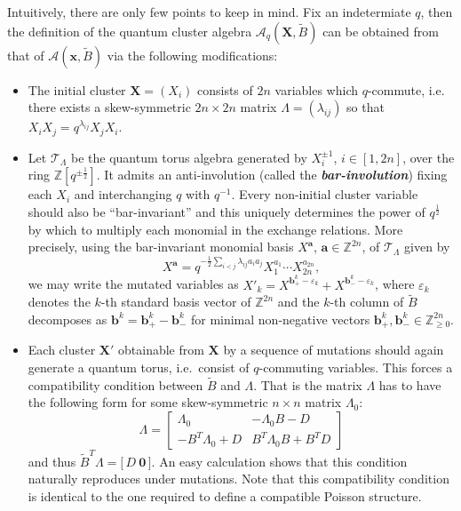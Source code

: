 \documentclass[12pt]{amsart}
\newcommand{\bfa}{\mathbf{a}}
\newcommand{\bfb}{\mathbf{b}}
\newcommand{\bfx}{\mathbf{x}}
\newcommand{\bfX}{\mathbf{X}}
\newcommand{\cA}{\mathcal{A}}
\newcommand{\cT}{\mathcal{T}}
\newcommand{\half}{{\frac{1}{2}}}
\newcommand{\ZZ}{\mathbb{Z}}
\newcommand{\newword}[1]{\textbf{\emph{#1}}}
\begin{document}
  Intuitively, there are only few points to keep in mind.
  Fix an indetermiate $q$, then the definition of the quantum cluster algebra $\cA_q(\bfX,\widetilde B)$ can be obtained from that of $\cA(\bfx,\widetilde B)$ via the following modifications:
  \begin{itemize}
    \item 
      The initial cluster $\bfX=(X_i)$ consists of $2n$ variables which $q$-commute, i.e. there exists a skew-symmetric $2n\times 2n$ matrix $\Lambda=(\lambda_{ij})$ so that $X_iX_j=q^{\lambda_{ij}}X_jX_i$.  
    
    \item 
      Let $\cT_\Lambda$ be the quantum torus algebra generated by $X_i^{\pm1}$, $i\in[1,2n]$, over the ring $\ZZ[q^{\pm\half}]$.
      It admits an anti-involution (called the \newword{bar-involution}) fixing each $X_i$ and interchanging $q$ with $q^{-1}$.
      Every non-initial cluster variable should also be ``bar-invariant'' and this uniquely determines the power of $q^\half$ by which to multiply each monomial in the exchange relations.  
      More precisely, using the bar-invariant monomial basis $X^\bfa$, $\bfa\in\ZZ^{2n}$, of $\cT_\Lambda$ given by
      \[
        X^\bfa=q^{-\half\sum\limits_{i<j}\lambda_{ij}a_ia_j}X_1^{a_1}\cdots X_{2n}^{a_{2n}},
      \]
      we may write the mutated variables as $X'_k=X^{\bfb_+^k-\varepsilon_k}+X^{\bfb_-^k-\varepsilon_k}$, where $\varepsilon_k$ denotes the $k$-th standard basis vector of $\ZZ^{2n}$ and the $k$-th column of $\widetilde{B}$ decomposes as $\bfb^k=\bfb^k_+-\bfb^k_-$ for minimal non-negative vectors $\bfb^k_+,\bfb^k_-\in\ZZ_{\ge0}^{2n}$.

    \item 
      Each cluster $\bfX'$ obtainable from $\bfX$ by a sequence of mutations should again generate a quantum torus, i.e.\ consist of $q$-commuting variables.
      This forces a compatibility condition between $\widetilde{B}$ and $\Lambda$.
      That is the matrix $\Lambda$ has to have the following form for some skew-symmetric $n\times n$ matrix $\Lambda_0$:
      \[
        \Lambda
        =
        \left[
          \begin{array}{cc}
            \Lambda_0 & -\Lambda_0B-D\\ 
            -B^T\Lambda_0+D & B^T\Lambda_0B+B^TD
          \end{array}
        \right]
      \]
      and thus $\widetilde{B}^T\Lambda=\big[\,D\ \boldsymbol{0}\,\big]$.
      An easy calculation shows that this condition naturally reproduces under mutations.
      Note that this compatibility condition is identical to the one required to define a compatible Poisson structure.

  \end{itemize}
\end{document}
